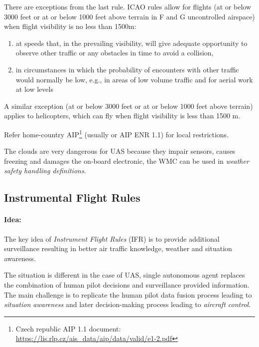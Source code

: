 \noindent There are exceptions from the last rule. ICAO rules allow for flights (at or below 3000 feet or at or below 1000 feet above terrain in F and G uncontrolled airspace) when flight visibility is no less than 1500m:
\begin{enumerate}
    \item at speeds that, in the prevailing visibility, will give adequate opportunity to observe other traffic or any obstacles in time to avoid a collision,
    
    \item in circumstances in which the probability of encounters with other traffic would normally be low, e.g., in areas of low volume traffic and for aerial work at low levels
\end{enumerate}

\noindent A similar exception (at or below 3000 feet or at or below 1000 feet above terrain) applies to helicopters, which can fly when flight visibility is less than 1500 m.

Refer home-country AIP\footnote{Czech republic AIP 1.1 document: \url{https://lis.rlp.cz/ais_data/aip/data/valid/e1-2.pdf}} (usually  or AIP ENR 1.1) for local restrictions.

\begin{note}
    The clouds are very dangerous for UAS because they impair sensors, causes freezing and damages the on-board electronic, the WMC can be used in \emph{weather safety handling definitions}.
\end{note}

\subsection{Instrumental Flight Rules}\label{sec:InstrumentalFlightRules}
\paragraph{Idea:} The key idea of \emph{Instrument Flight Rules} (IFR) is to provide additional surveillance resulting in better air traffic knowledge, weather and situation awareness. 

The situation is different in the case of UAS, single autonomous agent replaces the combination of human pilot decisions and surveillance provided information. The main challenge is to replicate the human pilot data fusion process leading to \emph{situation awareness} and later decision-making process leading to \emph{aircraft control}.

